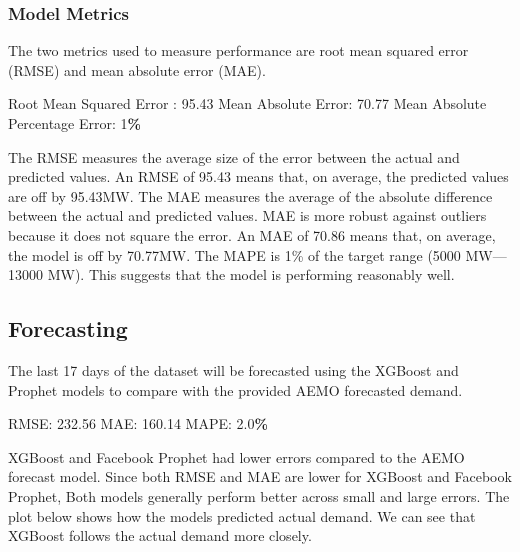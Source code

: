 \documentclass[mstat,12pt]{unswthesis}
\newenvironment{Shaded}{\begin{snugshade}}{\end{snugshade}}
\newcommand{\DecValTok}[1]{\textcolor[rgb]{0.00,0.00,0.81}{#1}}
\newcommand{\FloatTok}[1]{\textcolor[rgb]{0.00,0.00,0.81}{#1}}
\newcommand{\NormalTok}[1]{#1}
\newcommand{\OperatorTok}[1]{\textcolor[rgb]{0.81,0.36,0.00}{\textbf{#1}}}
\begin{document}
\hypertarget{model-metrics}{%
\subsubsection{Model Metrics}\label{model-metrics}}

The two metrics used to measure performance are root mean squared error
(RMSE) and mean absolute error (MAE).

\begin{Shaded}
\begin{Highlighting}[]
\NormalTok{Root Mean Squared Error : }\FloatTok{95.43}
\NormalTok{Mean Absolute Error: }\FloatTok{70.77}
\NormalTok{Mean Absolute Percentage Error: }\DecValTok{1}\OperatorTok{\%}
\end{Highlighting}
\end{Shaded}

The RMSE measures the average size of the error between the actual and
predicted values. An RMSE of 95.43 means that, on average, the predicted
values are off by 95.43MW. The MAE measures the average of the absolute
difference between the actual and predicted values. MAE is more robust
against outliers because it does not square the error. An MAE of 70.86
means that, on average, the model is off by 70.77MW. The MAPE is 1\% of
the target range (5000 MW---13000 MW). This suggests that the model is
performing reasonably well.

\hypertarget{forecasting}{%
\subsection{Forecasting}\label{forecasting}}

The last 17 days of the dataset will be forecasted using the XGBoost and
Prophet models to compare with the provided AEMO forecasted demand.

\begin{Shaded}
\begin{Highlighting}[]
\NormalTok{RMSE: }\FloatTok{232.56}
\NormalTok{MAE: }\FloatTok{160.14}
\NormalTok{MAPE: }\FloatTok{2.0}\OperatorTok{\%}
\end{Highlighting}
\end{Shaded}

XGBoost and Facebook Prophet had lower errors compared to the AEMO
forecast model. Since both RMSE and MAE are lower for XGBoost and
Facebook Prophet, Both models generally perform better across small and
large errors. The plot below shows how the models predicted actual
demand. We can see that XGBoost follows the actual demand more closely.
\end{document}
